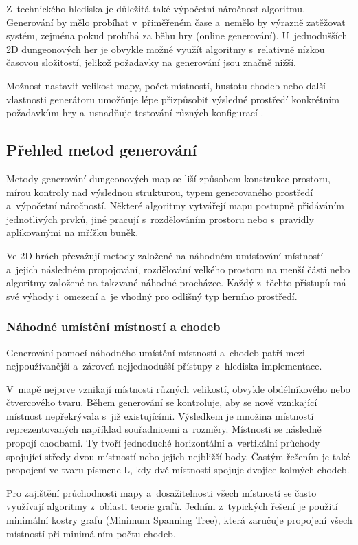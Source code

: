 \documentclass[
   program=itk,
   biblatex,
   figures=true,
   tables=true,
   glossaries,
   index
]{kidiplom}
\begin{document}
Z~technického hlediska je důležitá také výpočetní náročnost algoritmu. Generování by mělo probíhat v~přiměřeném čase a~nemělo by výrazně zatěžovat systém, zejména pokud probíhá za běhu hry (online generování). U~jednodušších 2D dungeonových her je obvykle možné využít algoritmy s~relativně nízkou časovou složitostí, jelikož požadavky na generování jsou značně nižší.

Možnost nastavit velikost mapy, počet místností, hustotu chodeb nebo další vlastnosti generátoru umožňuje lépe přizpůsobit výsledné prostředí konkrétním požadavkům hry a~usnadňuje testování různých konfigurací \cite{Linden2014,Shaker2016}.

\subsection{Přehled metod generování}
\label{sec:prehledMetod}
Metody generování dungeonových map se liší způsobem konstrukce prostoru, mírou kontroly nad výslednou strukturou, typem generovaného prostředí a~výpočetní náročností. Některé algoritmy vytvářejí mapu postupně přidáváním jednotlivých prvků, jiné pracují s~rozdělováním prostoru nebo s~pravidly aplikovanými na mřížku buněk.

Ve 2D hrách převažují metody založené na náhodném umísťování místností a~jejich následném propojování, rozdělování velkého prostoru na menší části nebo algoritmy založené na takzvané náhodné procházce. Každý z~těchto přístupů má své výhody i~omezení a~je vhodný pro odlišný typ herního prostředí.

\subsubsection{Náhodné umístění místností a chodeb}
Generování pomocí náhodného umístění místností a~chodeb patří mezi nejpoužívanější a~zároveň nejjednodušší přístupy z~hlediska implementace.

V~mapě nejprve vznikají místnosti různých velikostí, obvykle obdélníkového nebo čtvercového tvaru. Během generování se kontroluje, aby se nově vznikající místnost nepřekrývala s~již existujícími. Výsledkem je množina místností reprezentovaných například souřadnicemi a~rozměry. Místnosti se následně propojí chodbami. Ty tvoří jednoduché horizontální a~vertikální průchody spojující středy dvou místností nebo jejich nejbližší body. Častým řešením je také propojení ve tvaru písmene L, kdy dvě místnosti spojuje dvojice kolmých chodeb.

Pro zajištění průchodnosti mapy a~dosažitelnosti všech místností se často využívají algoritmy z~oblasti teorie grafů. Jedním z~typických řešení je použití minimální kostry grafu (Minimum Spanning Tree), která zaručuje propojení všech místností při minimálním počtu chodeb.
\end{document}
